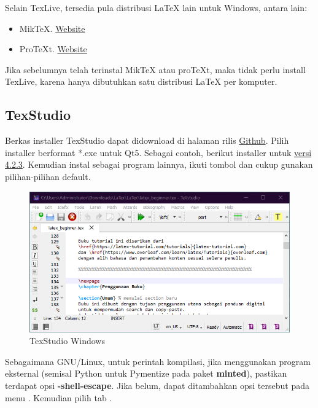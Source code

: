 \documentclass{book} %
\begin{document}
	Selain TexLive, tersedia pula distribusi \LaTeX{} lain untuk Windows, antara lain:
	\begin{itemize}
		\item MikTeX. \href{https://miktex.org/}{Website}
		\item ProTeXt. \href{https://www.tug.org/protext/}{Website}
	\end{itemize}

	Jika sebelumnya telah terinstal MikTeX atau proTeXt, maka tidak perlu install TexLive, karena hanya dibutuhkan satu distribusi \LaTeX{} per komputer.

	\subsection{TexStudio}

	Berkas installer TexStudio dapat didownload di halaman rilis \href{https://github.com/texstudio-org/texstudio/releases/}{Github}.
	Pilih installer berformat *.exe untuk Qt5.
	Sebagai contoh, berikut installer untuk \href{https://github.com/texstudio-org/texstudio/releases/download/4.2.3/texstudio-4.2.3-win-qt5.exe}{versi 4.2.3}.
	Kemudian instal sebagai program lainnya, ikuti tombol  dan cukup gunakan pilihan-pilihan default.

	\begin{figure}[!ht]
		\centering
		\includegraphics[width=400pt]{images/texstudiowin0}
		\caption{TexStudio Windows}
	\end{figure}

	Sebagaimana GNU/Linux, untuk perintah kompilasi, jika menggunakan program eksternal (semisal Python untuk Pymentize pada paket \textbf{minted}),
	pastikan terdapat opsi \textbf{-shell-escape}.
	Jika belum, dapat ditambahkan opsi tersebut pada menu .
	Kemudian pilih tab .
\end{document}
